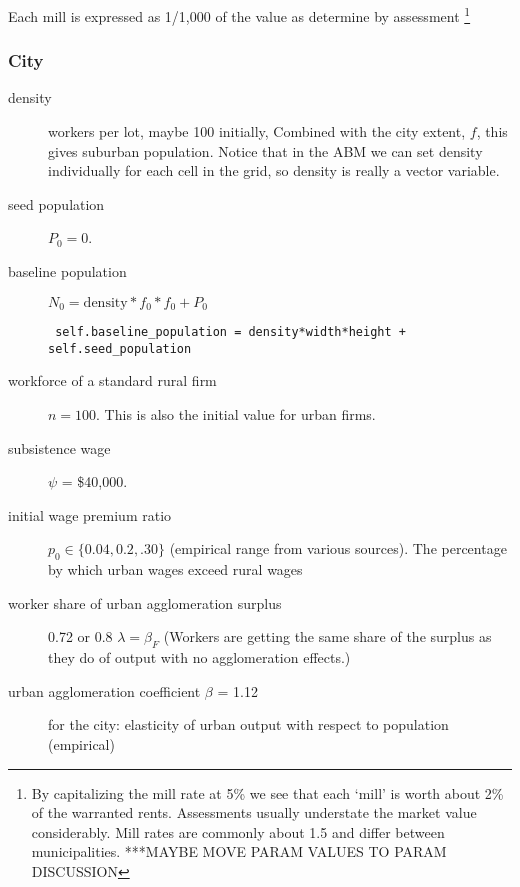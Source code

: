 Each mill is expressed as  1/1,000 of the value as determine by assessment \footnote{By capitalizing the mill rate at 5\%  we see that each `mill' is worth about 2\% of the warranted rents. Assessments usually understate the market value considerably. Mill rates are commonly about 1.5 and differ between municipalities. ***MAYBE MOVE PARAM VALUES TO PARAM DISCUSSION}



\subsubsection{City}
\begin{description}
\item [density] workers per lot, maybe 100 initially, Combined with the city extent, $f$, this gives suburban population. %
Notice that in the ABM we can set density individually for each cell in the grid, so density is really a vector variable.  %
\item [seed population] $P_0=0$. %
\item [baseline population]  $N_0=\mathrm{density} * f_0 * f_0 + P_0$ 
\begin{lstlisting}
 self.baseline_population = density*width*height + self.seed_population
\end{lstlisting}

\item [workforce of a standard rural firm] $n=100$. This is also the initial value for urban firms.


\item [subsistence wage] $\psi$ = \$40,000. %


\item [initial wage premium ratio] $p_0\in\{0.04,0.2,.30\}$ (empirical range from various sources). The percentage by which urban wages exceed rural wages 

\item [worker share of urban agglomeration surplus] 0.72 or 0.8 $\lambda=\beta_F$ (Workers are getting the same share of the surplus as they do of output with no agglomeration effects.) 
\item [urban agglomeration coefficient $\beta$ = 1.12] for the city: elasticity of urban output with respect to population (empirical)


\end{description}
